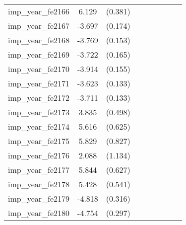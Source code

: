 {\begin{tabular}{l*{4}{cc}}
imp\_year\_fe2166&    6.129\sym{***}&  (0.381)&                  &         &                  &         &                  &         \\
imp\_year\_fe2167&   -3.697\sym{***}&  (0.174)&                  &         &                  &         &                  &         \\
imp\_year\_fe2168&   -3.769\sym{***}&  (0.153)&                  &         &                  &         &                  &         \\
imp\_year\_fe2169&   -3.722\sym{***}&  (0.165)&                  &         &                  &         &                  &         \\
imp\_year\_fe2170&   -3.914\sym{***}&  (0.155)&                  &         &                  &         &                  &         \\
imp\_year\_fe2171&   -3.623\sym{***}&  (0.133)&                  &         &                  &         &                  &         \\
imp\_year\_fe2172&   -3.711\sym{***}&  (0.133)&                  &         &                  &         &                  &         \\
imp\_year\_fe2173&    3.835\sym{***}&  (0.498)&                  &         &                  &         &                  &         \\
imp\_year\_fe2174&    5.616\sym{***}&  (0.625)&                  &         &                  &         &                  &         \\
imp\_year\_fe2175&    5.829\sym{***}&  (0.827)&                  &         &                  &         &                  &         \\
imp\_year\_fe2176&    2.088         &  (1.134)&                  &         &                  &         &                  &         \\
imp\_year\_fe2177&    5.844\sym{***}&  (0.627)&                  &         &                  &         &                  &         \\
imp\_year\_fe2178&    5.428\sym{***}&  (0.541)&                  &         &                  &         &                  &         \\
imp\_year\_fe2179&   -4.818\sym{***}&  (0.316)&                  &         &                  &         &                  &         \\
imp\_year\_fe2180&   -4.754\sym{***}&  (0.297)&                  &         &                  &         &                  &         \\

\end{tabular}}
